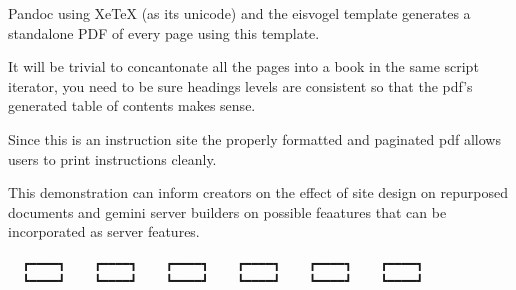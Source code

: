 \documentclass[
]{article}
\begin{document}
Pandoc using XeTeX (as its unicode) and the eisvogel template generates
a standalone PDF of every page using this template.

It will be trivial to concantonate all the pages into a book in the same
script iterator, you need to be sure headings levels are consistent so
that the pdf's generated table of contents makes sense.

Since this is an instruction site the properly formatted and paginated
pdf allows users to print instructions cleanly.

This demonstration can inform creators on the effect of site design on
repurposed documents and gemini server builders on possible feaatures
that can be incorporated as server features.

\begin{verbatim}
  ┏━━━━┓    ┏━━━━┓    ┏━━━━┓    ┏━━━━┓    ┏━━━━┓    ┏━━━━┓  
  ┗━━━━┛    ┗━━━━┛    ┗━━━━┛    ┗━━━━┛    ┗━━━━┛    ┗━━━━┛  
\end{verbatim}
\end{document}
